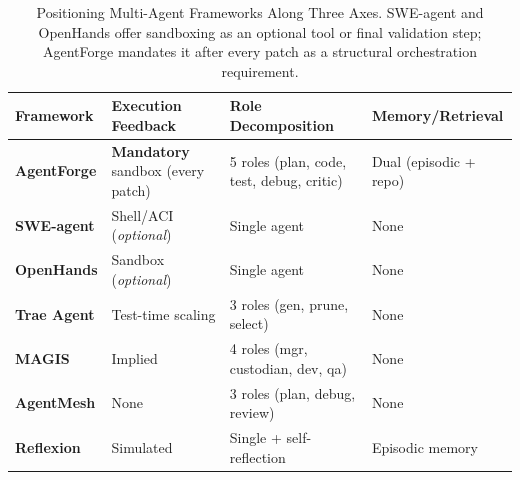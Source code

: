 \documentclass[journal]{IEEEtran}
\begin{document}
\begin{table}[t]
\centering
\caption{Positioning Multi-Agent Frameworks Along Three Axes. SWE-agent and OpenHands
         offer sandboxing as an optional tool or final validation step; AgentForge mandates
         it after every patch as a structural orchestration requirement.}
\label{tab:frameworks_axes}
\small
\setlength{\tabcolsep}{5pt}
\renewcommand{\arraystretch}{1.25}

\begin{tabular}{@{} l p{3.5cm} p{3.5cm} p{3.5cm} @{}}
\toprule
\textbf{Framework}
  & \textbf{Execution Feedback}
  & \textbf{Role Decomposition}
  & \textbf{Memory/Retrieval} \\
\midrule

\textbf{AgentForge}
  & \textbf{Mandatory} sandbox (every patch)
  & 5 roles (plan, code, test, debug, critic)
  & Dual (episodic + repo) \\

\textbf{SWE-agent}
  & Shell/ACI (\textit{optional})
  & Single agent
  & None \\

\textbf{OpenHands}
  & Sandbox (\textit{optional})
  & Single agent
  & None \\

\textbf{Trae Agent}
  & Test-time scaling
  & 3 roles (gen, prune, select)
  & None \\

\textbf{MAGIS}
  & Implied
  & 4 roles (mgr, custodian, dev, qa)
  & None \\

\textbf{AgentMesh}
  & None
  & 3 roles (plan, debug, review)
  & None \\

\textbf{Reflexion}
  & Simulated
  & Single + self-reflection
  & Episodic memory \\

\bottomrule
\end{tabular}
\end{table}
\end{document}
